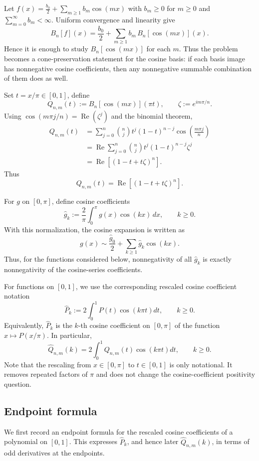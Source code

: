 \documentclass[a4paper,12pt]{amsart}
\theoremstyle{definition}
\theoremstyle{remark}
\DeclareMathOperator{\RealPart}{Re}
\renewcommand{\Re}{\RealPart}
\begin{document}
Let $f(x)=\frac{b_0}{2} + \sum_{m\ge1} b_m\cos(mx)$ with $b_m\ge0$ for $m \geq 0$ and $\sum_{m = 0}^\infty b_m<\infty$. Uniform convergence and linearity give
\[
  B_n[f](x)=\frac{b_0}{2}+\sum_{m\ge1}b_m\,B_n[\cos(mx)](x).
\]
Hence it is enough to study $B_n[\cos(mx)]$ for each $m$. Thus the problem becomes a cone-preservation statement for the cosine basis: if each basis image has nonnegative cosine coefficients, then any nonnegative summable combination of them does as well.

Set $t=x/\pi\in[0,1]$, define
\[
Q_{n,m}(t):=B_n[\cos(mx)](\pi t),\qquad \zeta:=e^{im\pi/n}.
\]
Using $\cos(m\pi j/n)=\Re(\zeta^j)$ and the binomial theorem,
\[
\begin{aligned}
Q_{n,m}(t)
&=\sum_{j=0}^{n}\binom{n}{j}t^j(1-t)^{n-j}
\cos\!\left(\frac{m\pi j}{n}\right) \\
&=\Re\sum_{j=0}^{n}\binom{n}{j}t^j(1-t)^{n-j}\zeta^j \\
&=\Re[(1-t+t\zeta)^n].
\end{aligned}
\]
Thus
\begin{equation}
\label{eq:Qclosed}
Q_{n,m}(t)=\Re[(1-t+t\zeta)^n].
\end{equation}

For $g$ on $[0,\pi]$, define cosine coefficients
\[
\widehat g_k:=\frac{2}{\pi}\int_0^\pi g(x)\cos(kx)\,dx,\qquad k\ge0.
\]
With this normalization, the cosine expansion is written as
\[
g(x) \sim \frac{\widehat g_0}{2} + \sum_{k\ge1}\widehat g_k\cos(kx).
\]
Thus, for the functions considered below, nonnegativity of all $\widehat g_k$ is exactly nonnegativity of the cosine-series coefficients.

For functions on $[0,1]$, we use the corresponding rescaled cosine coefficient notation 
\[ 
\widehat P_k := 2\int_0^1 P(t)\cos(k\pi t) dt,  \qquad k\ge 0. 
\] 
Equivalently, $\widehat P_k$ is the $k$-th cosine coefficient on $[0,\pi]$ of the function $x\mapsto P(x/\pi)$. In particular, 
\[
\widehat Q_{n,m}(k) = 2\int_0^1 Q_{n,m}(t)\cos(k\pi t) dt, \qquad k\ge 0. 
\]
Note that the rescaling from $x\in[0,\pi]$ to $t\in[0,1]$ is only notational. It removes repeated factors of $\pi$ and does not change the cosine-coefficient positivity question.

\subsection{Endpoint formula}

We first record an endpoint formula for the rescaled cosine coefficients of a polynomial on $[0,1]$. This expresses $\widehat P_k$, and hence later $\widehat Q_{n,m}(k)$, in terms of odd derivatives at the endpoints.
\end{document}
